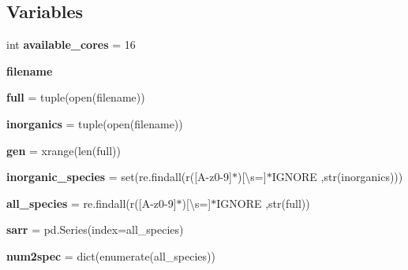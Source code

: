 \subsection*{Variables}
\begin{DoxyCompactItemize}
\item 
\mbox{\label{namespaceMCM__getdata_adfe73acab3b9fec3c96a8577dc2acd7a}} 
int {\bfseries available\+\_\+cores} = 16
\item 
\mbox{\label{namespaceMCM__getdata_a9d66f140b299c467b96d7398ee3b2daf}} 
{\bfseries filename}
\item 
\mbox{\label{namespaceMCM__getdata_a0c13efe15a67ccbbddd44b2d34e1aece}} 
{\bfseries full} = tuple(open(filename))
\item 
\mbox{\label{namespaceMCM__getdata_a35b98d88dad51f57350ecee371a0e8dc}} 
{\bfseries inorganics} = tuple(open(filename))
\item 
\mbox{\label{namespaceMCM__getdata_a483f96b19c47cdf2b2fca57ab6684479}} 
{\bfseries gen} = xrange(len(full))
\item 
\mbox{\label{namespaceMCM__getdata_a8bfc1bedfa4a307ae0d16416aaf3aa5a}} 
{\bfseries inorganic\+\_\+species} = set(re.\+findall(r\textquotesingle{}(\mbox{[}A-\/z0-\/9\mbox{]}$\ast$)\mbox{[}\textbackslash{}s=\mbox{]}$\ast$I\+G\+N\+O\+RE\textquotesingle{} ,str(inorganics)))
\item 
\mbox{\label{namespaceMCM__getdata_ab7bf5deca5ad8fc4e05cadd36a801e22}} 
{\bfseries all\+\_\+species} = re.\+findall(r\textquotesingle{}(\mbox{[}A-\/z0-\/9\mbox{]}$\ast$)\mbox{[}\textbackslash{}s=\mbox{]}$\ast$I\+G\+N\+O\+RE\textquotesingle{} ,str(full))
\item 
\mbox{\label{namespaceMCM__getdata_ae407c0f945744385b9cf214fdb50a36b}} 
{\bfseries sarr} = pd.\+Series(index=all\+\_\+species)
\item 
\mbox{\label{namespaceMCM__getdata_acd12adef9048f08b8b1587991431c6e6}} 
{\bfseries num2spec} = dict(enumerate(all\+\_\+species))

\end{DoxyCompactItemize}
